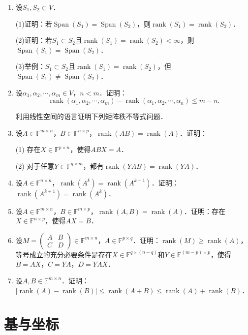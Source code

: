 \documentclass[a4paper,fontset=windows]{ctexbook}
\theoremstyle{definition}
\DeclareMathOperator{\rank}{rank}
\DeclareMathOperator{\Span}{Span}
\renewcommand{\le}{\leqslant}
\renewcommand{\ge}{\geqslant}
\begin{document}
\begin{enumerate}
\item 设$S_1,S_2\subset V$．

(1)证明：若$\Span(S_1)=\Span(S_2)$，则$\rank(S_1)=\rank(S_2)$．

(2)证明：若$S_1\subset S_2$且$\rank(S_1)=\rank(S_2)<\infty$，则$\Span(S_1)=\Span(S_2)$．

(3)举例：$S_1\subset S_2$且$\rank(S_1)=\rank(S_2)$，但$\Span(S_1)\ne\Span(S_2)$．

\item 设$\alpha_1,\alpha_2,\cdots,\alpha_m\in V$，$n<m$．证明：$$\rank(\alpha_1,\alpha_2,\cdots,\alpha_m)-\rank(\alpha_1,\alpha_2,\cdots,\alpha_n)\le m-n.$$

\hspace*{-25pt}利用线性空间的语言证明下列矩阵秩不等式问题．

\item 设$A\in\mathbb{F}^{m\times n}$，$B\in\mathbb{F}^{n\times p}$，$\rank(AB)=\rank(A)$．证明：

(1) 存在$X\in\mathbb{F}^{p\times n}$，使得$ABX=A$．

(2) 对于任意$Y\in\mathbb{F}^{q\times m}$，都有$\rank(YAB)=\rank(YA)$．

\item 设$A\in\mathbb{F}^{n\times n}$，$\rank(A^k)=\rank(A^{k-1})$．证明：$\rank(A^{k+1})=\rank(A^k)$．

\item 设$A\in\mathbb{F}^{m\times n}$，$B\in\mathbb{F}^{m\times p}$，$\rank(A,B)=\rank(A)$．证明：存在$X\in\mathbb{F}^{n\times p}$，使得$AX=B$．

\item 设$M=\begin{pmatrix}A&B \\ C&D\end{pmatrix}\in\mathbb{F}^{m\times n}$，$A\in\mathbb{F}^{p\times q}$．证明：$\rank(M)\ge\rank(A)$，等号成立的充分必要条件是存在$X\in\mathbb{F}^{q\times(n-q)}$和$Y\in\mathbb{F}^{(m-p)\times p}$，使得$B=AX$，$C=YA$，$D=YAX$．

\item 设$A,B\in\mathbb{F}^{m\times n}$．证明：$|\rank(A)-\rank(B)|\le\rank(A+B)\le\rank(A)+\rank(B)$．

\end{enumerate}

\clearpage\section{基与坐标}
\end{document}
